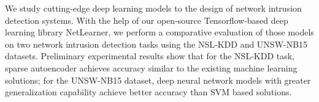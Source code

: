 
We study cutting-edge deep learning models to the design of network intrusion detection systems.
With the help of our open-source Tensorflow-based deep learning library NetLearner,
we perform a comparative evaluation of those models on two network intrusion detection tasks using the NSL-KDD and UNSW-NB15 datasets.
Preliminary experimental results show that for the NSL-KDD task, sparse autoencoder achieves accuracy similar to the existing machine learning solutions;
for the UNSW-NB15 dataset, deep neural network models with greater generalization capability achieve better accuracy than SVM based solutions.

